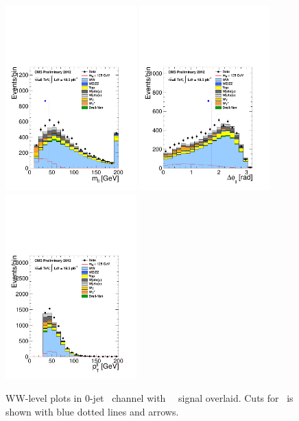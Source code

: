 \begin{figure}[htp]
\includegraphics[width=0.45\textwidth]{figures/hww_analysis16_125_ALL_of_0j_mll.pdf}
\includegraphics[width=0.45\textwidth]{figures/hww_analysis16_125_ALL_of_0j_dphi.pdf}
\includegraphics[width=0.45\textwidth]{figures/hww_analysis16_125_ALL_of_0j_ptll.pdf}
\caption{ WW-level plots in 0-jet \DF\ channel with ~\GeV\ signal overlaid. 
Cuts for \GeV\ is shown with blue dotted lines and arrows. 
}
\label{fig:wwlevelmh125}
\end{figure}


